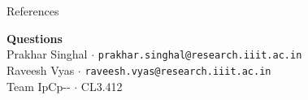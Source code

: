 \documentclass[aspectratio=169,10pt]{beamer}
\newcommand{\aside}[1]{{\color{ink2} #1}}
\begin{document}
\begin{frame}[allowframebreaks,t]{References}
  \scriptsize
  \renewcommand{\bibsection}{}
  \setlength{\bibsep}{1pt}
  
  
\end{frame}

\begin{frame}[plain]
  \vfill
  \centering
  {\Large\bfseries Questions}\\[14pt]
  \aside{Prakhar Singhal \;$\cdot$\; \texttt{prakhar.singhal@research.iiit.ac.in}}\\[3pt]
  \aside{Raveesh Vyas \;$\cdot$\; \texttt{raveesh.vyas@research.iiit.ac.in}}\\[8pt]
  \aside{Team IpCp-{}- \;$\cdot$\; CL3.412}
  \vfill
\end{frame}

\appendix

\begin{frame}[plain]
  \vfill{}\vfill
\end{frame}
\end{document}
